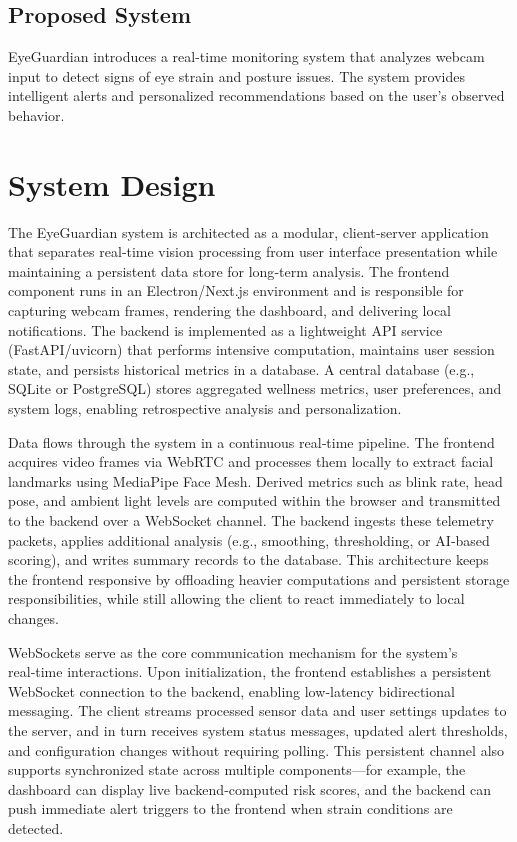 \documentclass[12pt]{report}
\begin{document}
\section{Proposed System}

EyeGuardian introduces a real-time monitoring system that analyzes webcam input to detect signs of eye strain and posture issues. The system provides intelligent alerts and personalized recommendations based on the user's observed behavior.


\chapter{System Design}

The EyeGuardian system is architected as a modular, client‑server application that separates real‑time vision processing from user interface presentation while maintaining a persistent data store for long‑term analysis. The frontend component runs in an Electron/Next.js environment and is responsible for capturing webcam frames, rendering the dashboard, and delivering local notifications. The backend is implemented as a lightweight API service (FastAPI/uvicorn) that performs intensive computation, maintains user session state, and persists historical metrics in a database. A central database (e.g., SQLite or PostgreSQL) stores aggregated wellness metrics, user preferences, and system logs, enabling retrospective analysis and personalization.

Data flows through the system in a continuous real‑time pipeline. The frontend acquires video frames via WebRTC and processes them locally to extract facial landmarks using MediaPipe Face Mesh. Derived metrics such as blink rate, head pose, and ambient light levels are computed within the browser and transmitted to the backend over a WebSocket channel. The backend ingests these telemetry packets, applies additional analysis (e.g., smoothing, thresholding, or AI‑based scoring), and writes summary records to the database. This architecture keeps the frontend responsive by offloading heavier computations and persistent storage responsibilities, while still allowing the client to react immediately to local changes.

WebSockets serve as the core communication mechanism for the system’s real‑time interactions. Upon initialization, the frontend establishes a persistent WebSocket connection to the backend, enabling low‑latency bidirectional messaging. The client streams processed sensor data and user settings updates to the server, and in turn receives system status messages, updated alert thresholds, and configuration changes without requiring polling. This persistent channel also supports synchronized state across multiple components—for example, the dashboard can display live backend‑computed risk scores, and the backend can push immediate alert triggers to the frontend when strain conditions are detected.
\end{document}
